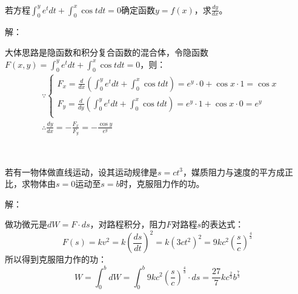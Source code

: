 ~

\begin{exercise}
若方程$\int_0^y{e^tdt}+\int_0^x{\cos tdt}=0$确定函数$y=f\left( x \right) $，求$\frac{dy}{dx}$。
\end{exercise}

解：

大体思路是隐函数和积分复合函数的混合体，令隐函数$F\left( x,y \right) =\int_0^y{e^tdt}+\int_0^x{\cos tdt}=0$，则：
\begin{align*}
&\because \begin{cases}
	F_x=\frac{d}{dx}\left( \int_0^y{e^tdt}+\int_0^x{\cos tdt} \right) =e^y\cdot 0+\cos x\cdot 1=\cos x\\
	F_y=\frac{d}{dy}\left( \int_0^y{e^tdt}+\int_0^x{\cos tdt} \right) =e^y\cdot 1+\cos x\cdot 0=e^y\\
\end{cases} \\
&\therefore \frac{dy}{dx}=-\frac{F_x}{F_y}=-\frac{\cos y}{e^y}
\end{align*}

~

\begin{exercise}
若有一物体做直线运动，设其运动规律是$s=ct^3$，媒质阻力与速度的平方成正比，求物体由$s=0$运动至$s=b$时，克服阻力作的功。
\end{exercise}

解：

做功微元是$dW=F\cdot ds$，对路程积分，阻力$F$对路程$s$的表达式：
\[
F\left( s \right) =kv^2=k\left( \frac{ds}{dt} \right) ^2=k\left( 3ct^2 \right) ^2=9kc^2\left( \frac{s}{c} \right) ^{\frac{4}{3}}
\]
所以得到克服阻力作的功：
\[
W=\int_0^b{dW}=\int_0^b{9kc^2\left( \frac{s}{c} \right) ^{\frac{4}{3}}\cdot ds}=\frac{27}{7}kc^{\frac{2}{3}}b^{\frac{7}{3}}
\]




